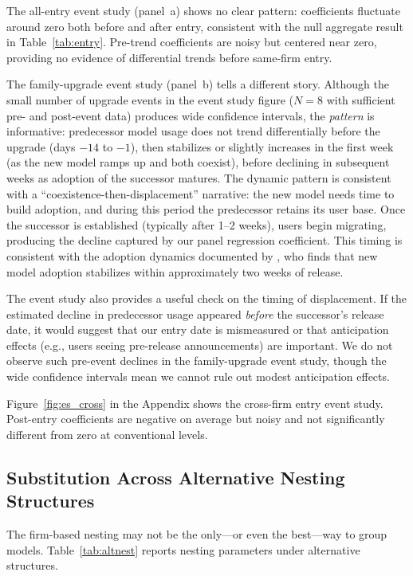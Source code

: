 \documentclass[11pt, a4paper]{article}
\begin{document}
The all-entry event study (panel~a) shows no clear pattern: coefficients fluctuate around zero both before and after entry, consistent with the null aggregate result in Table~\ref{tab:entry}. Pre-trend coefficients are noisy but centered near zero, providing no evidence of differential trends before same-firm entry.

The family-upgrade event study (panel~b) tells a different story. Although the small number of upgrade events in the event study figure ($N = 8$ with sufficient pre- and post-event data) produces wide confidence intervals, the \emph{pattern} is informative: predecessor model usage does not trend differentially before the upgrade (days $-14$ to $-1$), then stabilizes or slightly increases in the first week (as the new model ramps up and both coexist), before declining in subsequent weeks as adoption of the successor matures. The dynamic pattern is consistent with a ``coexistence-then-displacement'' narrative: the new model needs time to build adoption, and during this period the predecessor retains its user base. Once the successor is established (typically after 1--2 weeks), users begin migrating, producing the decline captured by our panel regression coefficient. This timing is consistent with the adoption dynamics documented by \citet{fradkin2025demand}, who finds that new model adoption stabilizes within approximately two weeks of release.

The event study also provides a useful check on the timing of displacement. If the estimated decline in predecessor usage appeared \emph{before} the successor's release date, it would suggest that our entry date is mismeasured or that anticipation effects (e.g., users seeing pre-release announcements) are important. We do not observe such pre-event declines in the family-upgrade event study, though the wide confidence intervals mean we cannot rule out modest anticipation effects.

Figure~\ref{fig:es_cross} in the Appendix shows the cross-firm entry event study. Post-entry coefficients are negative on average but noisy and not significantly different from zero at conventional levels.

\subsection{Substitution Across Alternative Nesting Structures}

The firm-based nesting may not be the only---or even the best---way to group models. Table~\ref{tab:altnest} reports nesting parameters under alternative structures.
\end{document}
